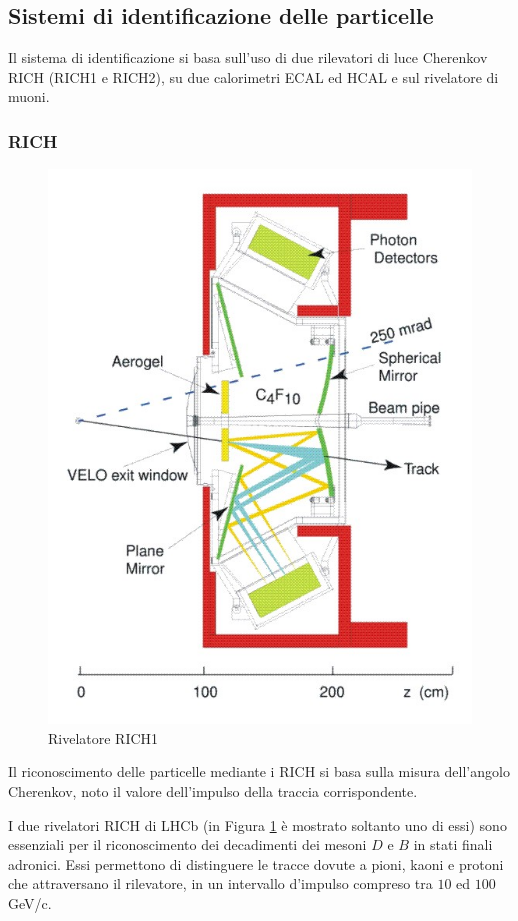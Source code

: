 \subsection{Sistemi di identificazione delle particelle}
\noindent
Il sistema di identificazione si basa sull'uso di due rilevatori di luce Cherenkov RICH (RICH1 e RICH2), su due calorimetri ECAL ed HCAL e sul rivelatore di muoni.
\subsubsection{RICH}
\noindent
\begin{figure}
\centering
\includegraphics[scale=1.5]{Immagini/rich}
\caption{Rivelatore RICH1}
\label{fig:rich}
\end{figure}
Il riconoscimento delle particelle mediante i RICH si basa sulla misura dell'angolo Cherenkov, noto il valore dell'impulso della traccia corrispondente.

I due rivelatori RICH di LHCb (in Figura \ref{fig:rich} \`e mostrato soltanto uno di essi) sono essenziali per il riconoscimento dei decadimenti dei mesoni $D$ e $B$ in stati finali adronici. Essi permettono di distinguere le tracce dovute a pioni, kaoni e protoni che attraversano il rilevatore, in un intervallo d'impulso compreso tra $10$ ed $100$ GeV/c.

